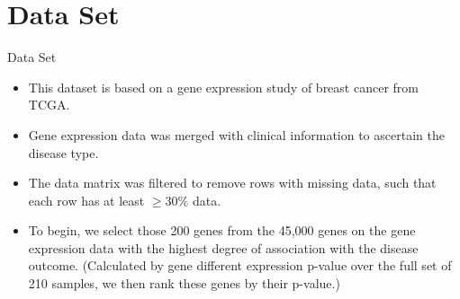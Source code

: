 \documentclass[xcolor=table]{beamer}
\numberwithin{figure}{section}
\numberwithin{equation}{section}
\begin{document}

\section{Data Set}

\begin{frame}{Data Set}
  \begin{itemize}
      \item This dataset is based on a gene expression study of breast cancer from TCGA. 
      \item Gene expression data was merged with clinical information to ascertain the disease type. 
      \item The data matrix was filtered to remove rows with missing data, such that each row has at least $\geq 30\%$ data.
      \item To begin, we select those 200 genes from the 45,000 genes on the gene expression data with the highest degree of association with the disease outcome. (Calculated by gene different expression p-value over the full set of 210 samples, we then rank these genes by their p-value.) %
  \end{itemize}
 
\end{frame}
\end{document}
